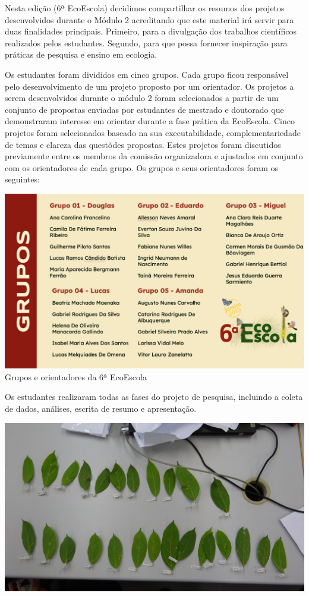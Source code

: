 \documentclass[
]{book}
\begin{document}
Nesta edição (6ª EcoEscola) decidimos compartilhar os resumos dos projetos desenvolvidos durante o Módulo 2 acreditando que este material irá servir para duas finalidades principais. Primeiro, para a divulgação dos trabalhos científicos realizados pelos estudantes. Segundo, para que possa fornecer inspiração para práticas de pesquisa e ensino em ecologia.

Os estudantes foram divididos em cinco grupos. Cada grupo ficou responsável pelo desenvolvimento de um projeto proposto por um orientador. Os projetos a serem desenvolvidos durante o módulo 2 foram selecionados a partir de um conjunto de propostas enviadas por estudantes de mestrado e doutorado que demonstraram interesse em orientar durante a fase prática da EcoEscola. Cinco projetos foram selecionados baseado na sua executabilidade, complementariedade de temas e clareza das questõdes propostas. Estes projetos foram discutidos previamente entre os membros da comissão organizadora e ajustados em conjunto com os orientadores de cada grupo. Os grupos e seus orientadores foram os seguintes:

\includegraphics[width=8.06in]{figs/grupos_modulo2}
Grupos e orientadores da 6ª EcoEscola

Os estudantes realizaram todas as fases do projeto de pesquisa, incluindo a coleta de dados, análises, escrita de resumo e apresentação.

\begin{center}\includegraphics[width=0.7\linewidth]{figs/coleta1} \end{center}
\end{document}
